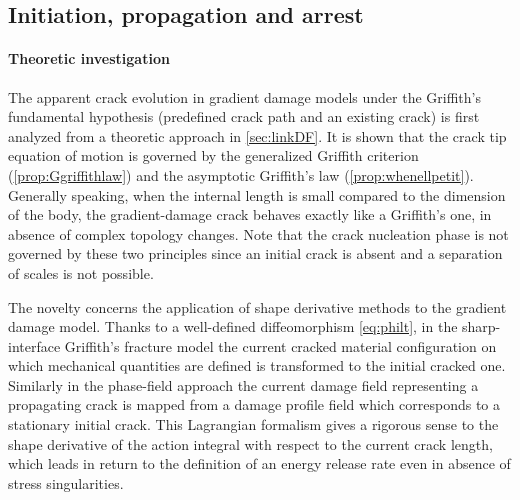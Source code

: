 \subsection{Initiation, propagation and arrest}
\paragraph{Theoretic investigation} The apparent crack evolution in gradient damage models under the Griffith's fundamental hypothesis (predefined crack path and an existing crack) is first analyzed from a theoretic approach in \cref{sec:linkDF}. It is shown that the crack tip equation of motion is governed by the generalized Griffith criterion (\cref{prop:Ggriffithlaw}) and the asymptotic Griffith's law (\cref{prop:whenellpetit}). Generally speaking, when the internal length is small compared to the dimension of the body, the gradient-damage crack behaves exactly like a Griffith's one, in absence of complex topology changes. Note that the crack nucleation phase is not governed by these two principles since an initial crack is absent and a separation of scales is not possible.

The novelty concerns the application of shape derivative methods \cite{Destuynder:1981} to the gradient damage model. Thanks to a well-defined diffeomorphism \eqref{eq:philt}, in the sharp-interface Griffith's fracture model the current cracked material configuration on which mechanical quantities are defined is transformed to the initial cracked one. Similarly in the phase-field approach the current damage field representing a propagating crack is mapped from a damage profile field which corresponds to a stationary initial crack. This Lagrangian formalism gives a rigorous sense to the shape derivative of the action integral with respect to the current crack length, which leads in return to the definition of an energy release rate even in absence of stress singularities.

